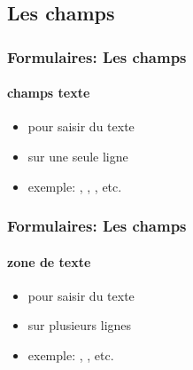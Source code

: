 \documentclass[xcolor=table]{beamer}
\begin{document}
\subsection{Les champs}

%
%

\begin{frame}
\frametitle{Formulaires: Les champs}
\framesubtitle{champs texte}

\begin{minipage}{0.69\textwidth}
	\begin{itemize}
		\item pour saisir du texte
		\item sur une seule ligne 
		\item exemple: , , , etc.
	\end{itemize}
\end{minipage}
\begin{minipage}{0.3\textwidth}
\end{minipage}

\end{frame}

\begin{frame}
\frametitle{Formulaires: Les champs}
\framesubtitle{zone de texte}

\begin{minipage}{0.50\textwidth}
	\begin{itemize}
		\item pour saisir du texte
		\item sur plusieurs lignes
		\item exemple: , , etc.
	\end{itemize}
\end{minipage}
\begin{minipage}{0.49\textwidth}
\end{minipage}

\end{frame}
\end{document}
